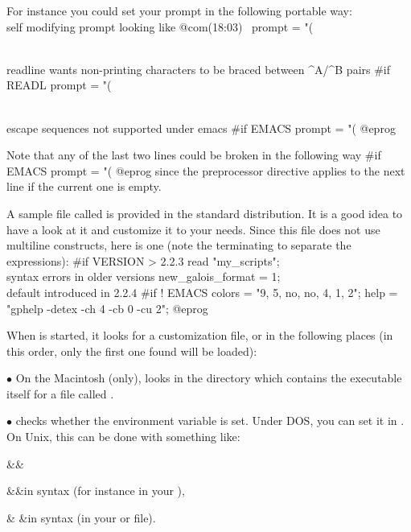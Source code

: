 \noindent For instance you could set your prompt in the following portable way:
\bprog
\\ self modifying prompt looking like @com\hbox{\rm(18:03) \kbd{ >}}
prompt   = "(%

\\ readline wants non-printing characters to be braced between ^A/^B pairs
#if READL prompt = "(%

\\ escape sequences not supported under emacs
#if EMACS prompt = "(%
@eprog

\noindent Note that any of the last two lines could be broken in the
following way
\bprog
#if EMACS
  prompt = "(%
@eprog
\noindent since the preprocessor directive applies to the next line if the
current one is empty.

A sample  file called  is provided in the
standard distribution. It is a good idea to have a look at it and customize
it to your needs. Since this file does not use multiline constructs, here is
one (note the terminating \kbd{;} to separate the expressions):
\bprog
#if VERSION > 2.2.3
{
  read "my_scripts";     \\ syntax errors in older versions
  new_galois_format = 1; \\ default introduced in 2.2.4
}
#if ! EMACS
{
  colors = "9, 5, no, no, 4, 1, 2";
  help   = "gphelp -detex -ch 4 -cb 0 -cu 2";
}
@eprog

When  is started, it looks for a customization file, or  in the
following places (in this order, only the first one found will be loaded):

\noindent$\bullet$ On the Macintosh (only),  looks in the directory
which contains the  executable itself for a file called .

\noindent$\bullet$  checks whether the environment variable
 is set. Under DOS, you can set it in . On Unix,
this can be done with something like: \smallskip

\settabs\+\indent&\quad&\cr

\+&\quad&in  syntax
(for instance in your ),\cr

\+& &in  syntax
(in your  or  file).\cr

